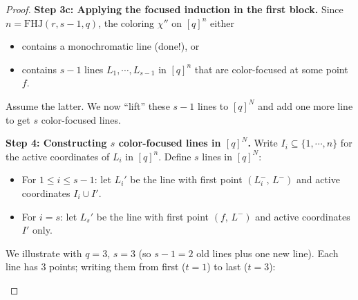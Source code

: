 \documentclass[11pt, a4paper]{ctexrep}
\begin{document}
\begin{proof}
    \medskip
    \noindent\textbf{Step 3c: Applying the focused induction in the first block.}
    Since $n=\mathrm{FHJ}(r,s-1,q)$, the coloring $\chi''$ on $[q]^n$ either
    \begin{itemize}
        \item contains a monochromatic line (done!), or
        \item contains $s-1$ lines $L_1,\cdots,L_{s-1}$ in $[q]^n$ that are color-focused at some point $f$.
    \end{itemize}
    Assume the latter. We now ``lift'' these $s-1$ lines to $[q]^N$ and add one more line to get $s$ color-focused lines.

    \medskip
    \noindent\textbf{Step 4: Constructing $s$ color-focused lines in $[q]^N$.}
    Write $I_i\subseteq\{1,\cdots,n\}$ for the active coordinates of $L_i$ in $[q]^n$. Define $s$ lines in $[q]^N$:
    \begin{itemize}
        \item For $1\leqslant i\leqslant s-1$: let $L_i'$ be the line with first point $(L_i^-,\, L^-)$ and active coordinates $I_i\cup I'$.
        \item For $i=s$: let $L_s'$ be the line with first point $(f,\, L^-)$ and active coordinates $I'$ only.
    \end{itemize}

    We illustrate with $q=3$, $s=3$ (so $s{-}1=2$ old lines plus one new line). Each line has $3$ points; writing them from first ($t=1$) to last ($t=3$):

    \smallskip
    \begin{center}
\end{center}
\end{proof}
\end{document}
